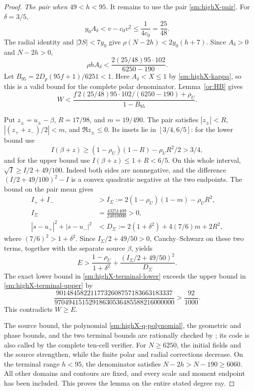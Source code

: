 \begin{proof}
\smallskip
\noindent\emph{The pair when $49<h<95$.}
It remains to use the pair \eqref{sm:highX-pair}.
For $\delta=3/5$,
\[
 y_0A_\delta<v-c_0v^2\le\frac1{4c_0}=\frac{25}{48}.
\]
The radial identity and $|\Im S|<7y_0$ give
$\rho(N-2h)<2y_0(h+7)$.
Since $A_\delta>0$ and $N-2h>0$,
\[
 \rho h A_\delta
 <\frac{2(25/48)95\cdot102}{6250-190}.
\]
Let $B_{95}=2D_p(95f+1)/6251<1$.
Here $A_\delta<X\le1$ by \eqref{sm:highX-kappa}, so this
is a valid bound for the complete polar denominator.
Lemma~\ref{or:HB} gives
\begin{equation}\label{sm:highX-terminal-upper}
 W<\frac{f\,2(25/48)95\cdot102/(6250-190)+\rho_U}{1-B_{95}}.
\end{equation}

Put $z_\pm=u_\pm-\beta$, $R=17/98$, and $m=19/490$.
The pair satisfies
$|z_\pm|<R$, $|(z_++z_-)/2|<m$, and $\Re z_\pm\le0$.
Its insets lie in $[3/4,6/5]$: for the lower bound use
\[
 I(\beta+z)\ge(1-\rho_U)(1-R)-\rho_UR^2/2>3/4,
\]
and for the upper bound use $I(\beta+z)\le1+R<6/5$.
On this whole interval,
$\sqrt I\ge I/2+49/100$.
Indeed both sides are nonnegative, and the difference
$(I/2+49/100)^2-I$ is a convex quadratic negative at
the two endpoints.
The bound on the pair mean gives
\begin{align*}
 I_++I_-&>I_\Sigma:=2(1-\rho_U)(1-m)-\rho_UR^2,\\
 I_\Sigma&=\frac{43251409}{24010000}>0,\\
 |s-u_+|^2+|s-u_-|^2
 &<D_\Sigma:=2(1+\delta^2)+4(7/6)m+2R^2,
\end{align*}
where $(7/6)^2>1+\delta^2$.
Since $I_\Sigma/2+49/50>0$, Cauchy--Schwarz on these two terms,
together with the separate source $\beta$, yields
\begin{equation}\label{sm:highX-terminal-lower}
 E>\frac{1-\rho_U}{1+\delta^2}
                    +\frac{(I_\Sigma/2+49/50)^2}{D_\Sigma}.
\end{equation}
The exact lower bound in \eqref{sm:highX-terminal-lower}
exceeds the upper bound in \eqref{sm:highX-terminal-upper} by
\[
 \frac{9014845822117732608757183663183337}
      {97049415152918630536485588216000000}>\frac{92}{1000}.
\]
This contradicts $W\ge E$.

The source bound, the polynomial
\eqref{sm:highX-q-polynomial}, the geometric and phase
bounds, and the two terminal bounds are rationally checked
by ; its code is also
called by the complete ten-cell verifier.
For $N\ge6250$, the initial fields and the source strengthen,
while the finite polar and radial corrections decrease.
On the terminal range $h<95$, the denominator satisfies
$N-2h>N-190\ge6060$. All other
domains and contours are fixed, and every scale and moment
endpoint has been included. This proves the lemma on the
entire stated degree ray.
\end{proof}

